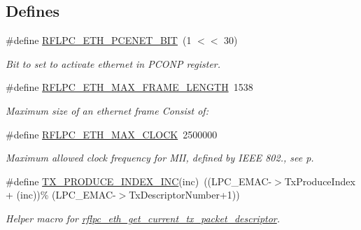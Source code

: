 \subsection*{Defines}
\begin{DoxyCompactItemize}
\item 
\hypertarget{group__eth_gabdad242ec4e3a7948e7ee71b22eab94d}{\#define \hyperlink{group__eth_gabdad242ec4e3a7948e7ee71b22eab94d}{R\-F\-L\-P\-C\-\_\-\-E\-T\-H\-\_\-\-P\-C\-E\-N\-E\-T\-\_\-\-B\-I\-T}~(1 $<$$<$ 30)}\label{group__eth_gabdad242ec4e3a7948e7ee71b22eab94d}

\begin{DoxyCompactList}\small\item\em Bit to set to activate ethernet in P\-C\-O\-N\-P register. \end{DoxyCompactList}\item 
\#define \hyperlink{group__eth_gabdb5479a16aa9c77c6954bed00ffeef2}{R\-F\-L\-P\-C\-\_\-\-E\-T\-H\-\_\-\-M\-A\-X\-\_\-\-F\-R\-A\-M\-E\-\_\-\-L\-E\-N\-G\-T\-H}~1538
\begin{DoxyCompactList}\small\item\em Maximum size of an ethernet frame Consist of\-: \end{DoxyCompactList}\item 
\#define \hyperlink{group__eth_ga379519025dad85582152eaf75f1d74fe}{R\-F\-L\-P\-C\-\_\-\-E\-T\-H\-\_\-\-M\-A\-X\-\_\-\-C\-L\-O\-C\-K}~2500000
\begin{DoxyCompactList}\small\item\em Maximum allowed clock frequency for M\-I\-I, defined by I\-E\-E\-E 802., see p. \end{DoxyCompactList}\item 
\hypertarget{group__eth_gaad17bd5da95409bc737382c92c774e7f}{\#define \hyperlink{group__eth_gaad17bd5da95409bc737382c92c774e7f}{T\-X\-\_\-\-P\-R\-O\-D\-U\-C\-E\-\_\-\-I\-N\-D\-E\-X\-\_\-\-I\-N\-C}(inc)~((L\-P\-C\-\_\-\-E\-M\-A\-C-\/$>$Tx\-Produce\-Index + (inc))\% (L\-P\-C\-\_\-\-E\-M\-A\-C-\/$>$Tx\-Descriptor\-Number+1))}\label{group__eth_gaad17bd5da95409bc737382c92c774e7f}

\begin{DoxyCompactList}\small\item\em Helper macro for \hyperlink{group__eth_ga73ce91815ea1ec2faad48fdd18b1fc80}{rflpc\-\_\-eth\-\_\-get\-\_\-current\-\_\-tx\-\_\-packet\-\_\-descriptor}. \end{DoxyCompactList}\end{DoxyCompactItemize}
